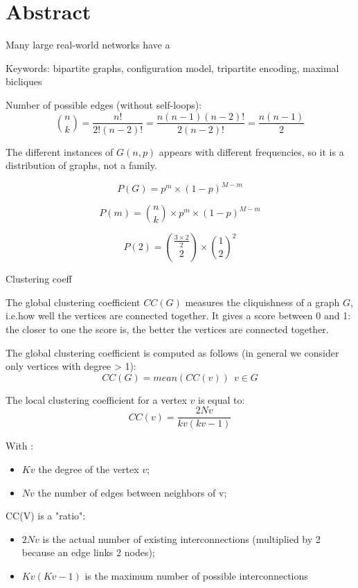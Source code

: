 \documentclass[11pt]{report}
\begin{document}
\tableofcontents


\newpage
\section*{Abstract}
Many large real-world networks have a 

Keywords: bipartite graphs, configuration model, tripartite encoding, maximal bicliques




Number of possible edges (without self-loops):
$$\binom{n}{k} = \dfrac{n!}{2!(n-2)!} = 
\dfrac{n(n-1)(n-2)!}{2(n-2)!} = \dfrac{n(n-1)}{2}$$

The different instances of $G(n,p)$ appears with different frequencies, so it is a distribution of graphs, not a family.

$$P(G)=p^{m}\times(1-p)^{M-m}$$

$$P(m)=\binom{n}{k}\times  p^{m}\times(1-p)^{M-m}$$


$$P(2) = \binom{\frac{3 \times 2}{2}}{2} \times \binom{1}{2}^{2}$$

\markedsubsection {} {Clustering coeff}

The global clustering coefficient $CC(G)$ measures the cliquishness of a graph $G$, i.e.how well the vertices are connected together. It gives a score between 0 and 1: the closer to one the score is, the better the vertices are connected together.

The global clustering coefficient is computed as follows (in general we consider only vertices  with degree > 1):
$$CC(G) = mean(CC(v)) \ \  v \in G $$ 


The local clustering coefficient for a vertex $v$ is equal to:
$$CC(v) = \dfrac{2Nv}{kv( kv-1) }$$

With : 

\begin{itemize}
    \item $Kv$ the degree of the vertex $v$;
    \item $Nv$ the number of edges between neighbors of v;
\end{itemize}



CC(V) is a "ratio":

\begin{itemize}
    \item $2Nv$ is the actual number of existing interconnections (multiplied by 2 because an edge links 2 nodes);
    \item $Kv(Kv-1)$ is the maximum number of possible interconnections
\end{itemize}
\end{document}
